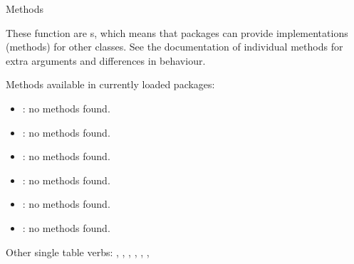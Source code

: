 \documentclass[a4paper]{book}
\begin{document}
\begin{Section}{Methods}

These function are s, which means that packages can provide
implementations (methods) for other classes. See the documentation of
individual methods for extra arguments and differences in behaviour.

Methods available in currently loaded packages:
\begin{itemize}

\item{} : no methods found.
\item{} : no methods found.
\item{} : no methods found.
\item{} : no methods found.
\item{} : no methods found.
\item{} : no methods found.

\end{itemize}

\end{Section}
%
\begin{SeeAlso}
Other single table verbs: 
,
,
,
,
,
,
\end{SeeAlso}
%
\end{document}
